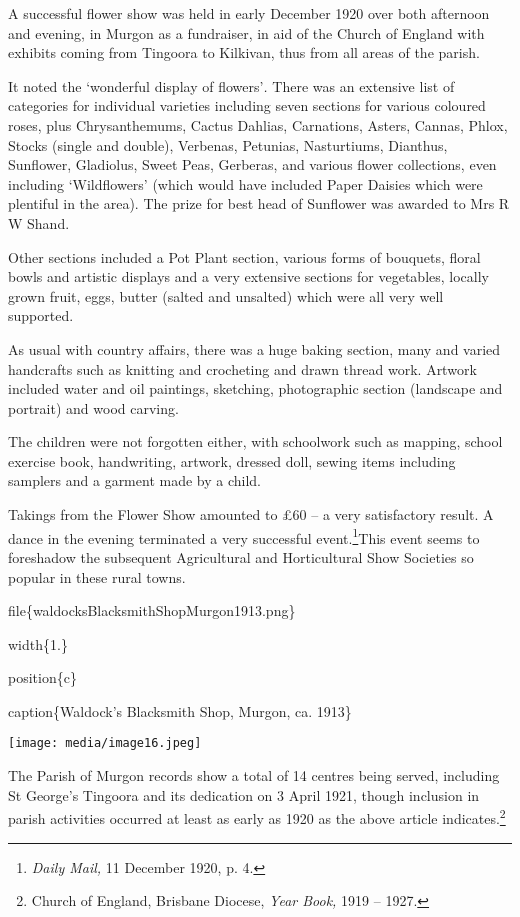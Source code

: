 A successful flower show was held in early December 1920 over both afternoon and evening, in Murgon as a fundraiser, in aid of the Church of England with exhibits coming from Tingoora to Kilkivan, thus from all areas of the parish.

It noted the `wonderful display of flowers'\emph{.} There was an extensive list of categories for individual varieties including seven sections for various coloured roses, plus Chrysanthemums, Cactus Dahlias, Carnations, Asters, Cannas, Phlox, Stocks (single and double), Verbenas, Petunias, Nasturtiums, Dianthus, Sunflower, Gladiolus, Sweet Peas, Gerberas, and various flower collections, even including `Wildflowers' (which would have included Paper Daisies which were plentiful in the area). The prize for best head of Sunflower was awarded to Mrs R W Shand.

Other sections included a Pot Plant section, various forms of bouquets, floral bowls and artistic displays and a very extensive sections for vegetables, locally grown fruit, eggs, butter (salted and unsalted) which were all very well supported.

As usual with country affairs, there was a huge baking section, many and varied handcrafts such as knitting and crocheting and drawn thread work. Artwork included water and oil paintings, sketching, photographic section (landscape and portrait) and wood carving.

The children were not forgotten either, with schoolwork such as mapping, school exercise book, handwriting, artwork, dressed doll, sewing items including samplers and a garment made by a child.

Takings from the Flower Show amounted to £60 -- a very satisfactory result. A dance in the evening terminated a very successful event.\footnote{\emph{Daily Mail,} 11 December 1920, p. 4.}This event seems to foreshadow the subsequent Agricultural and Horticultural Show Societies so popular in these rural towns.

file\{waldocksBlacksmithShopMurgon1913.png\}

width\{1.\}

position\{c\}

caption\{Waldock's Blacksmith Shop, Murgon, ca. 1913\}

\texttt{[image: media/image16.jpeg]}

The Parish of Murgon records show a total of 14 centres being served, including St George's Tingoora and its dedication on 3 April 1921, though inclusion in parish activities occurred at least as early as 1920 as the above article indicates.\footnote{Church of England, Brisbane Diocese, \emph{Year Book,} 1919 -- 1927.}

